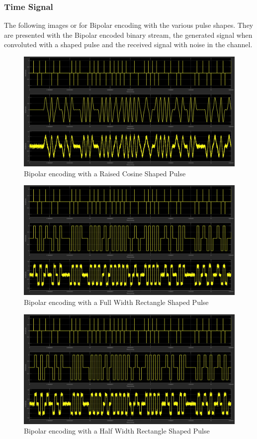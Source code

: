 \documentclass{article}
\begin{document}
\subsubsection{Time Signal}
The following images or for Bipolar encoding with the various pulse shapes. They
are presented with the Bipolar encoded binary stream, the generated signal when
convoluted with a shaped pulse and the received signal with noise in the channel.
\begin{figure}[H]
  \includegraphics[width = \linewidth]{BP_Raised.jpg}
  \caption{Bipolar encoding with a Raised Cosine Shaped Pulse}
  \label{fig:BP-Raised}
\end{figure}
\begin{figure}[H]
  \includegraphics[width = \linewidth]{BP_Rect_F.jpg}
  \caption{Bipolar encoding with a Full Width Rectangle Shaped Pulse}
  \label{fig:BP-Rect-F}
\end{figure}
\begin{figure}[H]
  \includegraphics[width = \linewidth]{BP_Rect_H.jpg}
  \caption{Bipolar encoding with a Half Width Rectangle Shaped Pulse}
  \label{fig:BP-Rect-H}
\end{figure}
\end{document}
